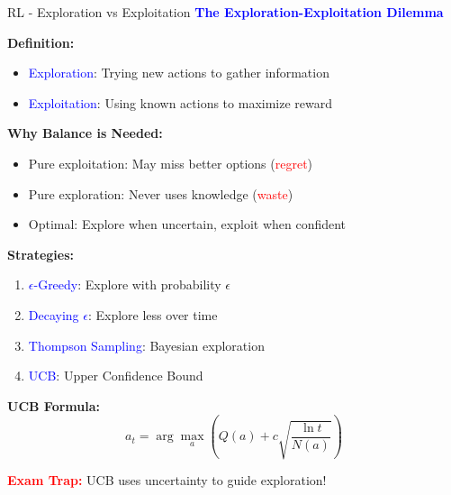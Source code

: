 \documentclass[8pt]{beamer}
\begin{document}
	\begin{frame}{RL - Exploration vs Exploitation}
		\fontsize{6.5}{7.5}\selectfont
		\textcolor{blue}{\textbf{The Exploration-Exploitation Dilemma}}
		
		\textbf{Definition:}
		\begin{itemize}
			\item \textcolor{blue}{Exploration}: Trying new actions to gather information
			\item \textcolor{blue}{Exploitation}: Using known actions to maximize reward
		\end{itemize}
		
		\textbf{Why Balance is Needed:}
		\begin{itemize}
			\item Pure exploitation: May miss better options (\textcolor{red}{regret})
			\item Pure exploration: Never uses knowledge (\textcolor{red}{waste})
			\item Optimal: Explore when uncertain, exploit when confident
		\end{itemize}
		
		\textbf{Strategies:}
		\begin{enumerate}
			\item \textcolor{blue}{$\epsilon$-Greedy}: Explore with probability $\epsilon$
			\item \textcolor{blue}{Decaying $\epsilon$}: Explore less over time
			\item \textcolor{blue}{Thompson Sampling}: Bayesian exploration
			\item \textcolor{blue}{UCB}: Upper Confidence Bound
		\end{enumerate}
		
		\textbf{UCB Formula:}
		\[
		a_t = \arg\max_a \left( Q(a) + c \sqrt{\frac{\ln t}{N(a)}} \right)
		\]
		
		\textcolor{red}{\textbf{Exam Trap:}} UCB uses uncertainty to guide exploration!
	\end{frame}
	
\end{document}
